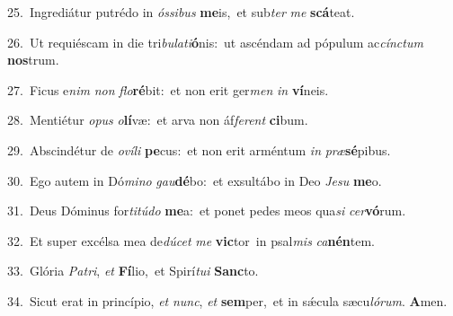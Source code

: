 {\numbfont\textcolor{\numbcolor}{25.}}~Ingrediátur putrédo in \textit{ós}\-\textit{si}\textit{bus} \textbf{me}\-is,~\star et sub\textit{ter} \textit{me} \textbf{scá}\-teat.\par
{\numbfont\textcolor{\numbcolor}{26.}}~Ut requiéscam in die tri\-\textit{bu}\-\textit{la}\textit{ti}\textbf{ó}nis:~\star ut ascéndam ad pópulum ac\-\textit{cínc}\-\textit{tum} \textbf{nos}\-trum.\par
{\numbfont\textcolor{\numbcolor}{27.}}~Ficus e\textit{nim} \textit{non} \textit{flo}\-\textbf{ré}bit:~\star et non erit ger\textit{men} \textit{in} \textbf{ví}\-neis.\par
{\numbfont\textcolor{\numbcolor}{28.}}~Mentiétur \textit{o}\-\textit{pus} \textit{o}\-\textbf{lí}væ:~\star et arva non áf\-\textit{fe}\-\textit{rent} \textbf{ci}\-bum.\par
{\numbfont\textcolor{\numbcolor}{29.}}~Abscindétur de \textit{o}\-\textit{ví}\textit{li} \textbf{pe}\-cus:~\star et non erit arméntum \textit{in} \textit{præ}\-\textbf{sé}pibus.\par
{\numbfont\textcolor{\numbcolor}{30.}}~Ego autem in Dó\-\textit{mi}\-\textit{no} \textit{gau}\-\textbf{dé}bo:~\star et exsultábo in Deo \textit{Je}\-\textit{su} \textbf{me}\-o.\par
{\numbfont\textcolor{\numbcolor}{31.}}~Deus Dóminus for\-\textit{ti}\-\textit{tú}\textit{do} \textbf{me}\-a:~\star et ponet pedes meos qua\textit{si} \textit{cer}\-\textbf{vó}rum.\par
{\numbfont\textcolor{\numbcolor}{32.}}~Et super excélsa mea de\-\textit{dú}\-\textit{cet} \textit{me} \textbf{vic}\-tor~\star in psal\textit{mis} \textit{ca}\-\textbf{nén}tem.\par
{\numbfont\textcolor{\numbcolor}{33.}}~Glória \textit{Pa}\-\textit{tri}, \textit{et} \textbf{Fí}\-lio,~\star et Spirí\-\textit{tu}\-\textit{i} \textbf{Sanc}\-to.\par
{\numbfont\textcolor{\numbcolor}{34.}}~Sicut erat in princípio, \textit{et} \textit{nunc}\-, \textit{et} \textbf{sem}\-per,~\star et in sǽcula sæcu\-\textit{ló}\-\textit{rum}. \textbf{A}\-men.\par
